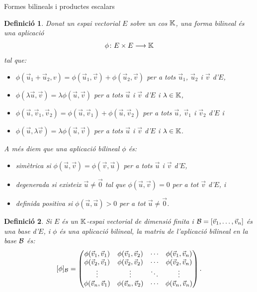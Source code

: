 \documentclass[
  11pt,
]{book}
\makeatletter
\numberwithin{dummy}{section}
\theoremstyle{maincolornumbox}
\theoremstyle{blacknumex}
\theoremstyle{blacknumbox}
\newtheorem{definitionT}{Definició}[chapter]
\theoremstyle{maincolornum}
\newenvironment{definition}{\begin{dBox}\begin{definitionT}}{\end{definitionT}\end{dBox}}
\renewcommand{\section}{\@startsection{section}{1}{\z@}
{-4ex \@plus -1ex \@minus -.4ex}
{1ex \@plus.2ex }
{\normalfont\large\sffamily\bfseries}}
\newlength\esp
\makeatother
\begin{document}
\hypertarget{formes-bilineals-i-productes-escalars}{%
\section{Formes bilineals i productes escalars}\label{formes-bilineals-i-productes-escalars}}

\begin{definition}

Donat un espai vectorial \(E\) sobre un cos \(\mathbb{K}\), una \emph{forma bilineal} és
una aplicació \[\phi \colon E \times E \longrightarrow \mathbb{K}\] tal que:

\begin{itemize}
\item
  \(\phi(\vec u_1+\vec u_2,v)=\phi(\vec u_1,\vec v)+\phi(\vec u_2,\vec v)\)
  per a tots \(\vec u_1\), \(\vec u_2\) i \(\vec v\) d'\(E\),
\item
  \(\phi(\lambda \vec u,\vec v)=\lambda \phi(\vec u,\vec v)\) per a tots
  \(\vec u\) i \(\vec v\) d'\(E\) i \(\lambda \in \mathbb{K}\),
\item
  \(\phi(\vec u,\vec v_1,\vec v_2)=\phi(\vec u,\vec v_1)+\phi(\vec u,\vec v_2)\)
  per a tots \(\vec u\), \(\vec v_1\) i \(\vec v_2\) d'\(E\) i
\item
  \(\phi(\vec u,\lambda \vec v)=\lambda \phi(\vec u,\vec v)\) per a tots
  \(\vec u\) i \(\vec v\) d'\(E\) i \(\lambda \in \mathbb{K}\).
\end{itemize}

A més diem que una aplicació bilineal \(\phi\) és:

\begin{itemize}
\item
  \emph{simètrica} si \(\phi(\vec u,\vec v)=\phi(\vec v,\vec u)\) per a tots
  \(\vec u\) i \(\vec v\) d'\(E\),
\item
  \emph{degenerada} si existeix \(\vec u\neq \vec 0\) tal que
  \(\phi(\vec u,\vec v)=0\) per a tot \(\vec v\) d'\(E\), i
\item
  \emph{definida positiva} si \(\phi(\vec u,\vec u)>0\) per a tot
  \(\vec u\neq \vec 0\).
\end{itemize}

\end{definition}

\begin{definition}
\protect\hypertarget{def:mat-apl-bil}{}\label{def:mat-apl-bil}Si \(E\) és un \(\mathbb{K}\)-espai
vectorial de dimensió finita i \(\mathcal{B}=[\vec v_1, \ldots, \vec v_n]\) és
una base d'\(E\), i \(\phi\) és una aplicació bilineal, \emph{la matriu de
l'aplicació bilineal en la base \(\mathcal{B}\)} és:
\[[\phi]_{\mathcal{B}}= \begin{pmatrix}
\phi(\vec v_1,\vec v_1) & \phi(\vec v_1,\vec v_2) & \cdots & \phi(\vec v_1,\vec v_n)\\
\phi(\vec v_2,\vec v_1) & \phi(\vec v_2,\vec v_2) & \cdots & \phi(\vec v_2,\vec v_n)\\
\vdots & \vdots & \ddots & \vdots \\
\phi(\vec v_n,\vec v_1) & \phi(\vec v_n,\vec v_2) & \cdots & \phi(\vec v_n,\vec v_n)
\end{pmatrix}.\]
\end{definition}
\end{document}
